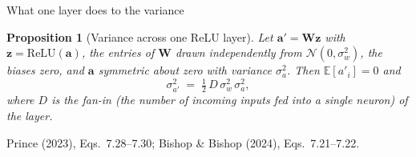 \documentclass[aspectratio=169, 11pt]{beamer}
\newtheorem{propx}[theorem]{Proposition}
\newcommand{\srcline}[1]{%
  \par\vspace{0.25em}%
  {\scriptsize\color{mcMuted}\hfill #1\par}}
\newcommand{\src}[3]{}      %
\begin{document}
\begin{frame}{What one layer does to the variance}
  \src{prince2023}{equation}{7.28-7.30}
  \src{prince2023}{section}{7.5.1}
  \src{bishop2024}{equation}{7.21-7.22}
  \src{bishop2024}{section}{7.2.5}
  \vspace{-0.25em}
  \begin{propx}[Variance across one ReLU layer]\label{th:var}
    \small
    Let $\mathbf{a}' = \mathbf{W} \mathbf{z}$ with $\mathbf{z} = \mathrm{ReLU}(\mathbf{a})$, the entries of $\mathbf{W}$ drawn
    independently from $\mathcal{N}(0, \sigma_w^2)$, the biases zero,
    and $\mathbf{a}$ symmetric about zero with variance $\sigma_a^2$. Then
    $\mathbb{E}[a'_i] = 0$ and
    \[
      \sigma_{a'}^2 \;=\; \tfrac12\, D\, \sigma_w^2\, \sigma_a^2 ,
    \]
    where $D$ is the fan-in (the number of incoming inputs fed into a single neuron) of the layer.
  \end{propx}
  \vspace{0.05em}
  \vspace{-0.4em}
  \srcline{Prince (2023), Eqs.~7.28--7.30; Bishop \& Bishop (2024),
  Eqs.~7.21--7.22.}
\end{frame}
\end{document}
